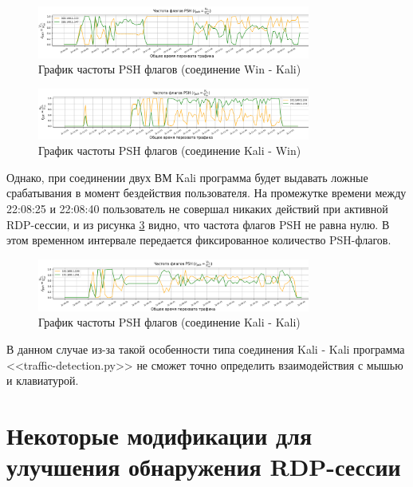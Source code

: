 \documentclass[bachelor, och, coursework]{SCWorks}
\begin{document}
\begin{figure}[H]
  \centering
  \includegraphics[width=0.8\textwidth]{photo/psh-winkal.png}
  \caption{График частоты PSH флагов (соединение Win - Kali)}
  \label{winkal-psh}
\end{figure}


\begin{figure}[H]
  \centering
  \includegraphics[width=0.8\textwidth]{photo/psh-kalwin.png}
  \caption{График частоты PSH флагов (соединение Kali - Win)}
  \label{kalwin-psh}
\end{figure}

Однако, при соединении двух ВМ Kali программа будет выдавать ложные срабатывания в момент бездействия пользователя. На промежутке времени
между 22:08:25 и 22:08:40 пользователь не совершал никаких действий при активной RDP-сессии, и из рисунка \ref{kali-psh} видно, что частота флагов
PSH не равна нулю. В этом временном интервале передается фиксированное количество PSH-флагов. 

\begin{figure}[H]
  \centering
  \includegraphics[width=0.8\textwidth]{photo/psh-kal.png}
  \caption{График частоты PSH флагов (соединение Kali - Kali)}
  \label{kali-psh}
\end{figure}

В данном случае из-за такой особенности типа соединения Kali - Kali программа <<traffic-detection.py>> не сможет точно определить 
взаимодействия с мышью и клавиатурой.



\section{Некоторые модификации для улучшения обнаружения RDP-сессии}
\end{document}
